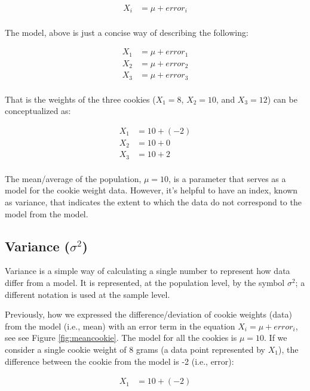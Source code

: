 \documentclass[
]{krantz}
\begin{document}
\[
\begin{aligned} 
X_i &= \mu + error_i \\
\end{aligned} 
\]

The model, above is just a concise way of describing the following:

\[
\begin{aligned} 
X_1 &= \mu + error_1 \\
X_2 &= \mu + error_2 \\
X_3 &= \mu + error_3 \\
\end{aligned} 
\]

That is the weights of the three cookies (\(X_1 = 8\), \(X_2 = 10\), and \(X_3 = 12\)) can be conceptualized as:

\[
\begin{aligned} 
X_1 &= 10 + (-2) \\
X_2 &= 10 + 0 \\
X_3 &= 10 + 2 \\
\end{aligned} 
\]

The mean/average of the population, \(\mu = 10\), is a parameter that serves as a model for the cookie weight data. However, it's helpful to have an index, known as variance, that indicates the extent to which the data do not correspond to the model from the model.

\hypertarget{variance-sigma2}{%
\subsection{\texorpdfstring{Variance (\(\sigma^2\))}{Variance (\textbackslash sigma\^{}2)}}\label{variance-sigma2}}

Variance is a simple way of calculating a single number to represent how data differ from a model. It is represented, at the population level, by the symbol \(\sigma^2\); a different notation is used at the sample level.

Previously, how we expressed the difference/deviation of cookie weights (data) from the model (i.e., mean) with an error term in the equation \(X_i = \mu +error_i\), see see Figure \ref{fig:meancookie}. The model for all the cookies is \(\mu = 10\). If we consider a single cookie weight of 8 grams (a data point represented by \(X_1\)), the difference between the cookie from the model is -2 (i.e., error):

\[
\begin{aligned} 
X_1 &= 10 + (-2) \\
\end{aligned} 
\]
\end{document}
